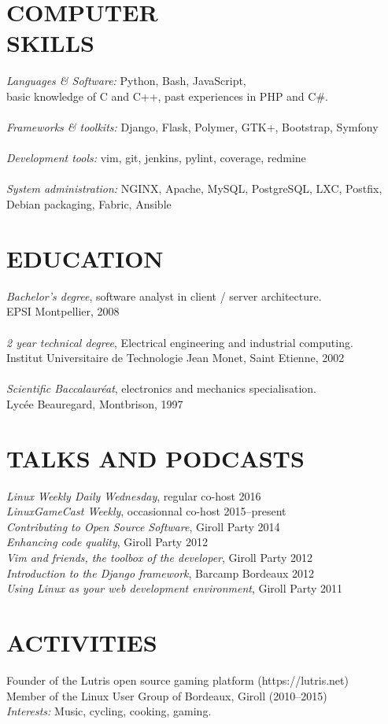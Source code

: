\documentclass[margin]{res}
\begin{document}
\begin{resume}
\section{COMPUTER \\ SKILLS}
    {\sl Languages \& Software:\/} Python, Bash, JavaScript, \\
        basic knowledge of C and C++, past experiences in PHP and C\#.\\ \\
    {\sl Frameworks \& toolkits:\/} Django, Flask, Polymer, GTK+, Bootstrap, Symfony\\ \\
    {\sl Development tools:\/} vim, git, jenkins, pylint, coverage, redmine\\ \\
    {\sl System administration:\/} NGINX, Apache, MySQL, PostgreSQL, LXC, Postfix,
        Debian packaging, Fabric, Ansible

\section{EDUCATION}
    {\sl Bachelor's degree}, software analyst in client / server architecture.\\
            EPSI Montpellier, 2008\\ \\
    {\sl 2 year technical degree}, Electrical engineering and  industrial computing.\\
            Institut Universitaire de Technologie Jean Monet, Saint Etienne, 2002\\ \\
    {\sl Scientific Baccalaur\'{e}at}, electronics and mechanics specialisation.\\
            Lyc\'{e}e Beauregard, Montbrison, 1997

\section{TALKS AND PODCASTS}
    {\sl Linux Weekly Daily Wednesday}, regular co-host \hfill 2016 \\
    {\sl LinuxGameCast Weekly}, occasionnal co-host \hfill 2015--present \\
    {\sl Contributing to Open Source Software}, Giroll Party \hfill 2014 \\
    {\sl Enhancing code quality}, Giroll Party \hfill 2012 \\
    {\sl Vim and friends, the toolbox of the developer}, Giroll Party \hfill 2012 \\
    {\sl Introduction to the Django framework}, Barcamp Bordeaux \hfill 2012 \\
    {\sl Using Linux as your web development environment}, Giroll Party \hfill 2011

\section{ACTIVITIES}
    Founder of the Lutris open source gaming platform (https://lutris.net)\\
    Member of the Linux User Group of Bordeaux, Giroll (2010--2015)\\
    {\sl Interests:\/} Music, cycling, cooking, gaming.

\end{resume}
\end{document}
